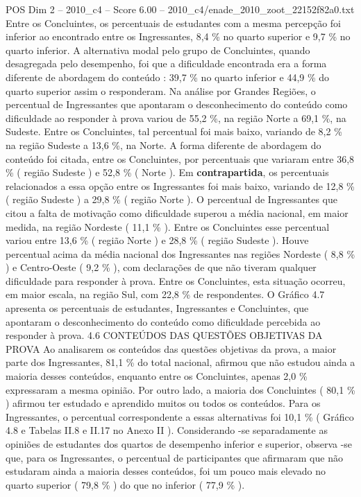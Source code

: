 \begin{textsample}{POS Dim 2 – 2010\_c4 – Score 6.00 – 2010\_c4/enade\_2010\_zoot\_22152f82a0.txt}
Entre os Concluintes, os percentuais de estudantes com a mesma percepção foi inferior ao encontrado entre os Ingressantes, 8,4 \% no quarto superior e 9,7 \% no quarto inferior.
A alternativa modal pelo grupo de Concluintes, quando desagregada pelo desempenho, foi que a dificuldade encontrada era a forma diferente de abordagem do conteúdo : 39,7 \% no quarto inferior e 44,9 \% do quarto superior assim o responderam.
Na análise por Grandes Regiões, o percentual de Ingressantes que apontaram o desconhecimento do conteúdo como dificuldade ao responder à prova variou de 55,2 \%, na região Norte a 69,1 \%, na Sudeste.
Entre os Concluintes, tal percentual foi mais baixo, variando de 8,2 \% na região Sudeste a 13,6 \%, na Norte.
A forma diferente de abordagem do conteúdo foi citada, entre os Concluintes, por percentuais que variaram entre 36,8 \% ( região Sudeste ) e 52,8 \% ( Norte ).
Em \textbf{contrapartida}, os percentuais relacionados a essa opção entre os Ingressantes foi mais baixo, variando de 12,8 \% ( região Sudeste ) a 29,8 \% ( região Norte ).
O percentual de Ingressantes que citou a falta de motivação como dificuldade superou a média nacional, em maior medida, na região Nordeste ( 11,1 \% ).
Entre os Concluintes esse percentual variou entre 13,6 \% ( região Norte ) e 28,8 \% ( região Sudeste ).
Houve percentual acima da média nacional dos Ingressantes nas regiões Nordeste ( 8,8 \% ) e Centro-Oeste ( 9,2 \% ), com declarações de que não tiveram qualquer dificuldade para responder à prova.
Entre os Concluintes, esta situação ocorreu, em maior escala, na região Sul, com 22,8 \% de respondentes.
O Gráfico 4.7 apresenta os percentuais de estudantes, Ingressantes e Concluintes, que apontaram o desconhecimento do conteúdo como dificuldade percebida ao responder à prova. 4.6 CONTEÚDOS DAS QUESTÕES OBJETIVAS DA PROVA Ao analisarem os conteúdos das questões objetivas da prova, a maior parte dos Ingressantes, 81,1 \% do total nacional, afirmou que não estudou ainda a maioria desses conteúdos, enquanto entre os Concluintes, apenas 2,0 \% expressaram a mesma opinião.
Por outro lado, a maioria dos Concluintes ( 80,1 \% ) afirmou ter estudado e aprendido muitos ou todos os conteúdos.
Para os Ingressantes, o percentual correspondente a essas alternativas foi 10,1 \% ( Gráfico 4.8 e Tabelas II.8 e II.17 no Anexo II ).
Considerando -se separadamente as opiniões de estudantes dos quartos de desempenho inferior e superior, observa -se que, para os Ingressantes, o percentual de participantes que afirmaram que não estudaram ainda a maioria desses conteúdos, foi um pouco mais elevado no quarto superior ( 79,8 \% ) do que no inferior ( 77,9 \% ).

\end{textsample}
